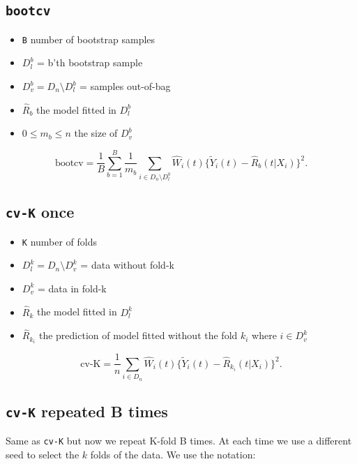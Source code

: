 \documentclass{article}
\begin{document}
\subsection{\texttt{bootcv}}
\label{sec:org688d21f}

\begin{itemize}
\item \texttt{B} number of bootstrap samples
\item \(D_l^b\) = b'th bootstrap sample
\item \(D_v^b=D_n \setminus D_l^b\)  = samples out-of-bag
\item \(\hat R_b\) the model fitted in \(D_l^b\)
\item \(0\le m_b \le n\) the size of \(D_v^b\)
\end{itemize}

\begin{equation*}
  \text{bootcv}= \frac 1 B \sum_{b=1}^B\frac{1}{m_b}
  \sum_{i\in D_n\setminus D^b_l}\hat
  W_i(t) \{\tilde Y_i(t)-\hat R_b(t|X_i)\}^2.
\end{equation*}

\subsection{\texttt{cv-K} once}
\label{sec:org03587f7}

\begin{itemize}
\item \texttt{K} number of folds
\item \(D_l^k=D_n \setminus D_v^k\) = data without fold-k
\item \(D_v^k\)  = data in fold-k
\item \(\hat R_k\) the model fitted in \(D_l^k\)
\item \(\hat R_{k_i}\) the prediction of model fitted without the fold \(k_i\) where \(i\in D_v^k\)
\end{itemize}

\begin{equation*}
\text{cv-K}=  \frac{1}{n} \sum_{i\in D_n}
  \hat W_i(t) \{\tilde Y_i(t)-\hat R_{k_i}(t|X_i)\}^2.
\end{equation*}

\subsection{\texttt{cv-K} repeated B times}
\label{sec:org790fb94}

Same as \texttt{cv-K} but now we repeat K-fold B times. At each time we use a
different seed to select the \(k\) folds of the data. We use the notation:
\end{document}
